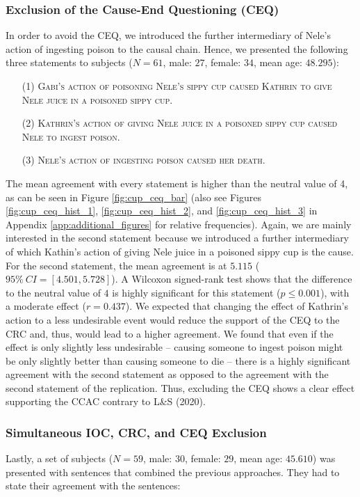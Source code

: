 \documentclass[egregdoesnotlikesansseriftitles,12pt]{scrartcl}
\begin{document}
\subsubsection{Exclusion of the Cause-End Questioning (CEQ)}\label{sec:results_cup_ceq}
In order to avoid the CEQ, we introduced the further intermediary of Nele's action of ingesting poison to the causal chain. Hence, we presented the following three statements to subjects ($N=61$, male: $27$, female: $34$, mean age: $48.295$):

\begin{itemize}
   \item[(1)]\textsc{Gabi's action of poisoning Nele's sippy cup caused Kathrin to give Nele juice in a poisoned sippy cup.}
   \item[(2)]\textsc{Kathrin's action of giving Nele juice in a poisoned sippy cup caused Nele to ingest poison.}
   \item[(3)]\textsc{Nele's action of ingesting poison caused her death.}
\end{itemize}

\noindent The mean agreement with every statement is higher than the neutral value of 4, as can be seen in Figure \ref{fig:cup_ceq_bar} (also see Figures \ref{fig:cup_ceq_hist_1}, \ref{fig:cup_ceq_hist_2}, and \ref{fig:cup_ceq_hist_3} in Appendix \ref{app:additional_figures} for relative frequencies). Again, we are mainly interested in the second statement because we introduced a further intermediary of which Kathin's action of giving Nele juice in a poisoned sippy cup is the cause. For the second statement, the mean agreement is at $5.115$ ($95\%~CI=[4.501,5.728]$). A Wilcoxon signed-rank test shows that the difference to the neutral value of $4$ is highly significant for this statement ($p \leq 0.001$), with a moderate effect ($r=0.437$). We expected that changing the effect of Kathrin's action to a less undesirable event would reduce the support of the CEQ to the CRC and, thus, would lead to a higher agreement. We found that even if the effect is only slightly less undesirable -- causing someone to ingest poison might be only slightly better than causing someone to die -- there is a highly significant agreement with the second statement as opposed to the agreement with the second statement of the replication. Thus, excluding the CEQ shows a clear effect supporting the CCAC contrary to L\&S (2020).

\subsubsection{Simultaneous IOC, CRC, and CEQ Exclusion}\label{sec:results_cup_com}
Lastly, a set of subjects ($N=59$, male: $30$, female: $29$, mean age: $45.610$) was presented with sentences that combined the previous approaches. They had to state their agreement with the sentences:
\end{document}
